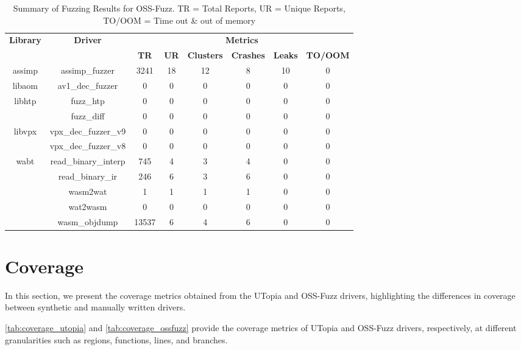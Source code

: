 \documentclass[a4paper,11pt,oneside]{report}
\begin{document}
\begin{table}[h]
  \centering
  \label{tab:crashes_ossfuzz}
  \caption{Summary of Fuzzing Results for OSS-Fuzz. TR = Total Reports, UR = Unique Reports, TO/OOM = Time out \& out of memory}
  \begin{tabular}{|c|c|c|c|c|c|c|c|}
    \hline
    \multirow{2}{*}{\textbf{Library}} & \multirow{2}{*}{\textbf{Driver}} & \multicolumn{6}{c|}{\textbf{Metrics}} \\
    \cline{3-8}
     &  & \textbf{TR} & \textbf{UR} & \textbf{Clusters} & \textbf{Crashes} & \textbf{Leaks} & \textbf{TO/OOM} \\
    \hline
    \multirow{1}{*}{assimp} & assimp\_fuzzer & 3241 & 18 & 12 & 8 & 10 & 0 \\
    \hline
    \multirow{1}{*}{libaom} & av1\_dec\_fuzzer & 0 & 0 & 0 & 0 & 0 & 0 \\
    \hline
    \multirow{2}{*}{libhtp} & fuzz\_htp & 0 & 0 & 0 & 0 & 0 & 0 \\
     & fuzz\_diff & 0 & 0 & 0 & 0 & 0 & 0 \\
    \hline
    \multirow{2}{*}{libvpx} & vpx\_dec\_fuzzer\_v9 & 0 & 0 & 0 & 0 & 0 & 0 \\
     & vpx\_dec\_fuzzer\_v8 & 0 & 0 & 0 & 0 & 0 & 0 \\
    \hline
    \multirow{5}{*}{wabt} & read\_binary\_interp & 745 & 4 & 3 & 4 & 0 & 0 \\
     & read\_binary\_ir & 246 & 6 & 3 & 6 & 0 & 0 \\
     & wasm2wat & 1 & 1 & 1 & 1 & 0 & 0 \\
     & wat2wasm & 0 & 0 & 0 & 0 & 0 & 0 \\
     & wasm\_objdump & 13537 & 6 & 4 & 6 & 0 & 0 \\
    \hline
  \end{tabular}
\end{table}

\section{Coverage}
In this section, we present the coverage metrics obtained from the UTopia
and OSS-Fuzz drivers, highlighting the differences in coverage between
synthetic and manually written drivers.

\autoref{tab:coverage_utopia} and \autoref{tab:coverage_ossfuzz} provide the
coverage metrics of UTopia and OSS-Fuzz drivers, respectively, at different
granularities such as regions, functions, lines, and branches. 
\end{document}
